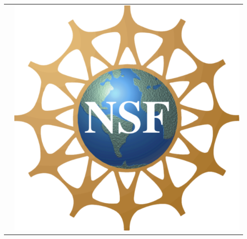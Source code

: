 \documentclass[final]{beamer}
\begin{document}
\begin{frame}[t]
\begin{columns}
\begin{column}{0.3\paperwidth}
\begin{tabular}{cc}
\begin{minipage}{8.5in}
\end{minipage}

& 
\begin{minipage}{2.5in}
\includegraphics[scale=.35]{NSF_logo.png}
\end{minipage}
\end{tabular}
		\end{column}
		
		\begin{column}{0.3\paperwidth}


\end{column}
\end{columns}
\end{frame}
\end{document}
